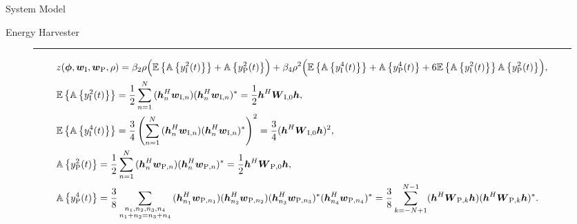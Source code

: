 \begin{section}{System Model}
\begin{subsection}{Energy Harvester}
		\begin{figure*}[!b]
			\hrule
			\begin{align}
				&z(\boldsymbol{\phi},\boldsymbol{w}_{\mathrm{I}},\boldsymbol{w}_{\mathrm{P}},\rho) = \beta_2\rho\Bigl(\mathbb{E}\left\{\mathbb{A}\left\{y_{\mathrm{I}}^2(t)\right\}\right\}+\mathbb{A}\left\{y_{\mathrm{P}}^2(t)\right\}\Bigr)+\beta_4\rho^2\Bigl(\mathbb{E}\left\{\mathbb{A}\left\{y_{\mathrm{I}}^4(t)\right\}\right\}+\mathbb{A}\left\{y_{\mathrm{P}}^4(t)\right\}+6\mathbb{E}\left\{\mathbb{A}\left\{y_{\mathrm{I}}^2(t)\right\}\right\}\mathbb{A}\left\{y_{\mathrm{P}}^2(t)\right\}\Bigr),\label{eq:z_expand}\\
				&\mathbb{E}\left\{\mathbb{A}\left\{y_{\mathrm{I}}^2(t)\right\}\right\} = \frac{1}{2}\sum_{n=1}^N{(\boldsymbol{h}_{n}^H\boldsymbol{w}_{\mathrm{I},n})(\boldsymbol{h}_{n}^H\boldsymbol{w}_{\mathrm{I},n})^*} = \frac{1}{2}\boldsymbol{h}^H\boldsymbol{W}_{\mathrm{I},0}\boldsymbol{h},\label{eq:y_I2}\\
				&\mathbb{E}\left\{\mathbb{A}\left\{y_{\mathrm{I}}^4(t)\right\}\right\} = \frac{3}{4}\left(\sum_{n=1}^N{(\boldsymbol{h}_{n}^H\boldsymbol{w}_{\mathrm{I},n})(\boldsymbol{h}_{n}^H\boldsymbol{w}_{\mathrm{I},n})^*}\right)^2 = \frac{3}{4}(\boldsymbol{h}^H\boldsymbol{W}_{\mathrm{I},0}\boldsymbol{h})^2,\label{eq:y_I4}\\
				&\mathbb{A}\left\{y_{\mathrm{P}}^2(t)\right\} = \frac{1}{2}\sum_{n=1}^N{(\boldsymbol{h}_{n}^H\boldsymbol{w}_{\mathrm{P},n})(\boldsymbol{h}_{n}^H\boldsymbol{w}_{\mathrm{P},n})^*} = \frac{1}{2}\boldsymbol{h}^H\boldsymbol{W}_{\mathrm{P},0}\boldsymbol{h},\label{eq:y_P2}\\
				&\mathbb{A}\left\{y_{\mathrm{P}}^4(t)\right\} = \frac{3}{8}\sum_{\substack{{n_1},{n_2},{n_3},{n_4}\\{n_1}+{n_2}={n_3}+{n_4}}}{(\boldsymbol{h}_{{n_1}}^H\boldsymbol{w}_{\mathrm{P},{n_1}})(\boldsymbol{h}_{{n_2}}^H\boldsymbol{w}_{\mathrm{P},{n_2}})(\boldsymbol{h}_{{n_3}}^H\boldsymbol{w}_{\mathrm{P},{n_3}})^*(\boldsymbol{h}_{{n_4}}^H\boldsymbol{w}_{\mathrm{P},{n_4}})^*} = \frac{3}{8}\sum_{k=-N+1}^{N-1}(\boldsymbol{h}^H\boldsymbol{W}_{\mathrm{P},k}\boldsymbol{h})(\boldsymbol{h}^H\boldsymbol{W}_{\mathrm{P},k}\boldsymbol{h})^*.\label{eq:y_P4}
			\end{align}
		\end{figure*}
	\end{subsection}



\end{section}

